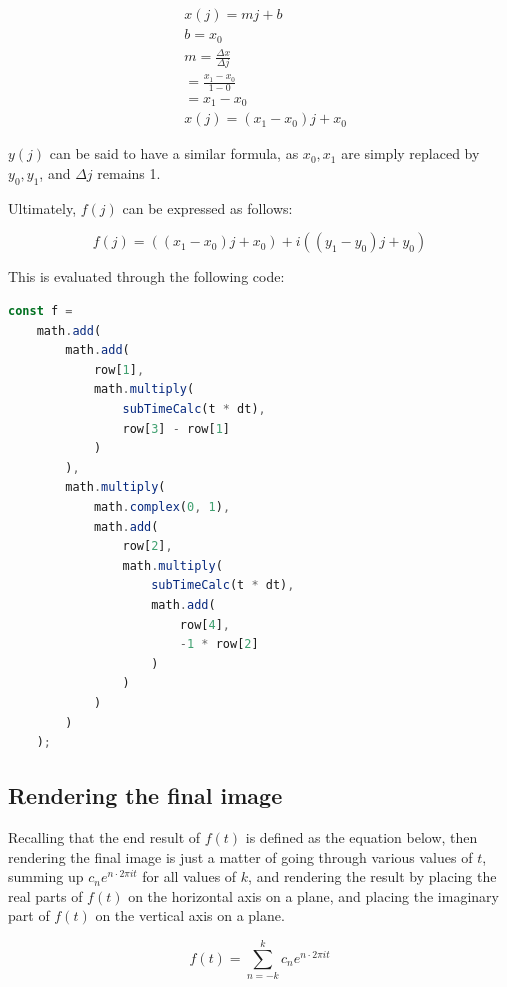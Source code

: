\documentclass[letterpaper, 12pt]{article}
\begin{document}
\begin{align*}
     & x(j) = mj + b
    \\
     & b = x_0
    \\
     & m = \frac{\Delta x}{\Delta j}
    \\
     & = \frac{x_1 - x_0}{1 - 0}
    \\
     & = x_1 - x_0
    \\
     & x(j) = (x_1 - x_0)j + x_0
\end{align*}

\(y(j)\) can be said to have a similar formula, as \(x_0, x_1\) are
simply replaced by \(y_0, y_1\), and \(\Delta j\) remains 1.

Ultimately, \(f(j)\) can be expressed as follows:

\begin{equation}
    f(j) = ((x_1 - x_0)j + x_0) + i((y_1 - y_0)j + y_0)
\end{equation}

This is evaluated through the following code:
\begin{lstlisting}[language=JavaScript]
    const f =
    math.add(
        math.add(
            row[1],
            math.multiply(
                subTimeCalc(t * dt),
                row[3] - row[1]
            )
        ),
        math.multiply(
            math.complex(0, 1),
            math.add(
                row[2],
                math.multiply(
                    subTimeCalc(t * dt),
                    math.add(
                        row[4],
                        -1 * row[2]
                    )
                )
            )
        )
    );
\end{lstlisting}

\subsection{Rendering the final image}

Recalling that the end result of \(f(t)\) is defined as the equation
below, then rendering the final image is just a matter of going
through various values of \(t\), summing up \(c_n e^{n \cdot 2\pi it}\)
for all values of \(k\), and rendering the result by placing
the real parts of \(f(t)\) on the horizontal axis on a plane,
and placing the imaginary part of \(f(t)\) on the vertical axis
on a plane.

\begin{equation*}
    f(t) = \sum_{n=-k}^{k} c_n e^{n \cdot 2\pi it}
\end{equation*}
\end{document}
